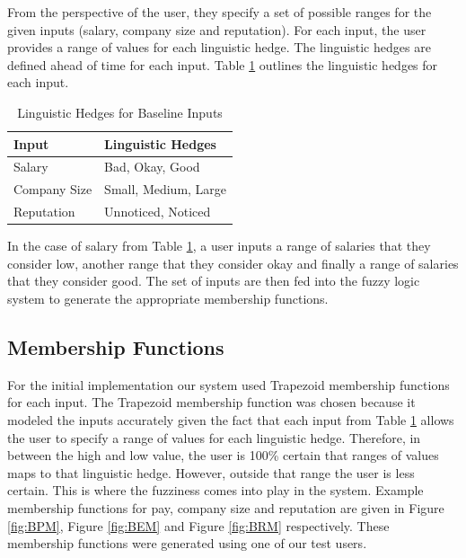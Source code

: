 \documentclass[12pt,fleqn,reqno,letterpaper]{article}
\begin{document}
From the perspective of the user, they specify a set of possible ranges for the given inputs (salary, company size and reputation). For each input, the user provides a range of values for each linguistic hedge. The linguistic hedges are defined ahead of time for each input. Table \ref{tbl:LINGUISTIC-HEDGES} outlines the linguistic hedges for each input.


\begin{table}[h]
  \caption{Linguistic Hedges for Baseline Inputs}
  \label{tbl:LINGUISTIC-HEDGES}
\begin{tabular}{|l|l|}
\hline
\textbf{Input} & \textbf{Linguistic Hedges} \\ \hline
Salary         & Bad, Okay, Good            \\ \hline
Company Size   & Small, Medium, Large       \\ \hline
Reputation     & Unnoticed, Noticed         \\ \hline
\end{tabular}
\end{table}

In the case of salary from Table \ref{tbl:LINGUISTIC-HEDGES}, a user inputs a range of salaries that they consider low, another range that they consider okay and finally a range of salaries that they consider good. The set of inputs are then fed into the fuzzy logic system to generate the appropriate membership functions.

\subsection{Membership Functions}
\label{sec:membership_fn}
For the initial implementation our system used Trapezoid membership functions for each input. The Trapezoid membership function was chosen because it modeled the inputs accurately given the fact that each input from Table \ref{tbl:LINGUISTIC-HEDGES} allows the user to specify a range of values for each linguistic hedge. Therefore, in between the high and low value, the user is 100\% certain that ranges of values maps to that linguistic hedge. However, outside that range the user is less certain. This is where the fuzziness comes into play in the system. Example membership functions for pay, company size and reputation are given in Figure \ref{fig:BPM}, Figure \ref{fig:BEM} and Figure \ref{fig:BRM} respectively. These membership functions were generated using one of our test users.
\end{document}
